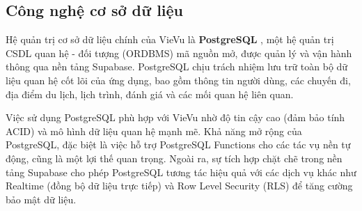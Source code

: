 \subsection{Công nghệ cơ sở dữ liệu}

\label{subsec:database}
Hệ quản trị cơ sở dữ liệu chính của VieVu là \textbf{PostgreSQL} \cite{postgresql_doc}, một hệ quản trị CSDL quan hệ - đối tượng (ORDBMS) mã nguồn mở, được quản lý và vận hành thông qua nền tảng Supabase. PostgreSQL chịu trách nhiệm lưu trữ toàn bộ dữ liệu quan hệ cốt lõi của ứng dụng, bao gồm thông tin người dùng, các chuyến đi, địa điểm du lịch, lịch trình, đánh giá và các mối quan hệ liên quan.

Việc sử dụng PostgreSQL phù hợp với VieVu nhờ độ tin cậy cao (đảm bảo tính ACID) và mô hình dữ liệu quan hệ mạnh mẽ. Khả năng mở rộng của PostgreSQL, đặc biệt là việc hỗ trợ PostgreSQL Functions cho các tác vụ nền tự động, cũng là một lợi thế quan trọng. Ngoài ra, sự tích hợp chặt chẽ trong nền tảng Supabase cho phép PostgreSQL tương tác hiệu quả với các dịch vụ khác như Realtime (đồng bộ dữ liệu trực tiếp) và Row Level Security (RLS) để tăng cường bảo mật dữ liệu.
